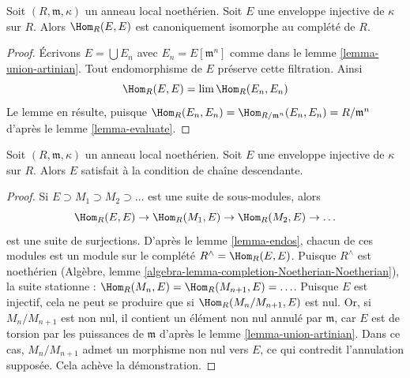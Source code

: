 \begin{lemma}
\label{lemma-endos}
Soit $(R, \mathfrak m, \kappa)$ un anneau local noethérien.
Soit $E$ une enveloppe injective de $\kappa$ sur $R$.
Alors $\Hom_R(E, E)$ est canoniquement isomorphe au complété de $R$.
\end{lemma}

\begin{proof}
Écrivons $E = \bigcup E_n$ avec $E_n = E[\mathfrak m^n]$ comme dans le lemme \ref{lemma-union-artinian}.
Tout endomorphisme de $E$ préserve cette filtration. Ainsi
$$
\Hom_R(E, E) = \lim \Hom_R(E_n, E_n)
$$
Le lemme en résulte, puisque
$\Hom_R(E_n, E_n) = \Hom_{R/\mathfrak m^n}(E_n, E_n) = R/\mathfrak m^n$
d'après le lemme \ref{lemma-evaluate}.
\end{proof}

\begin{lemma}
\label{lemma-injective-hull-has-dcc}
Soit $(R, \mathfrak m, \kappa)$ un anneau local noethérien.
Soit $E$ une enveloppe injective de $\kappa$ sur $R$.
Alors $E$ satisfait à la condition de chaîne descendante.
\end{lemma}

\begin{proof}
Si $E \supset M_1 \supset M_2 \supset \ldots$ est une suite de sous-modules, alors
$$
\Hom_R(E, E) \to \Hom_R(M_1, E) \to \Hom_R(M_2, E) \to \ldots
$$
est une suite de surjections. D'après le lemme \ref{lemma-endos},
chacun de ces modules est un module sur le complété $R^\wedge = \Hom_R(E, E)$.
Puisque $R^\wedge$ est noethérien (Algèbre, lemme \ref{algebra-lemma-completion-Noetherian-Noetherian}),
la suite stationne : $\Hom_R(M_n, E) = \Hom_R(M_{n + 1}, E) = \ldots$.
Puisque $E$ est injectif, cela ne peut se produire que si $\Hom_R(M_n/M_{n + 1}, E)$ est nul.
Or, si $M_n/M_{n + 1}$ est non nul, il contient un élément non nul annulé par $\mathfrak m$,
car $E$ est de torsion par les puissances de $\mathfrak m$ d'après le lemme \ref{lemma-union-artinian}.
Dans ce cas, $M_n/M_{n + 1}$ admet un morphisme non nul vers $E$,
ce qui contredit l'annulation supposée. Cela achève la démonstration.
\end{proof}

